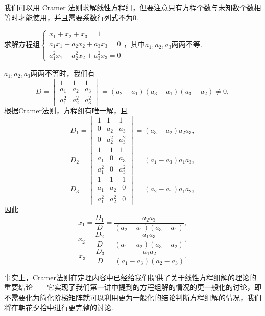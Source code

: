 我们可以用 Cramer 法则求解线性方程组，但要注意只有方程个数与未知数个数相等时才能使用，并且需要系数行列式不为0.
\begin{example}{}{}
    求解方程组$\begin{cases}
            x_1+x_2+x_3=1          \\
            a_1x_1+a_2x_2+a_3x_3=0 \\
            a_1^2x_1+a_2^2x_2+a_3^2x_3=0
        \end{cases}$，其中$a_1,a_2,a_3$两两不等.
\end{example}

\begin{solution}
    $a_1,a_2,a_3$两两不等时，我们有
    \[D=\begin{vmatrix}
            1     & 1     & 1     \\
            a_1   & a_2   & a_3   \\
            a_1^2 & a_2^2 & a_3^2
        \end{vmatrix}=(a_2-a_1)(a_3-a_1)(a_3-a_2)\neq 0,\]
    根据Cramer法则，方程组有唯一解，且
    \[D_1=\begin{vmatrix}
            1 & 1     & 1     \\
            0 & a_2   & a_3   \\
            0 & a_2^2 & a_3^2
        \end{vmatrix}=(a_3-a_2)a_2a_3,\]
    \[D_2=\begin{vmatrix}
            1     & 1 & 1     \\
            a_1   & 0 & a_3   \\
            a_1^2 & 0 & a_3^2
        \end{vmatrix}=(a_1-a_3)a_1a_3,\]
    \[D_3=\begin{vmatrix}
            1     & 1     & 1 \\
            a_1   & a_2   & 0 \\
            a_1^2 & a_2^2 & 0
        \end{vmatrix}=(a_2-a_1)a_1a_2,\]
    因此
    \[x_1=\dfrac{D_1}{D}=\dfrac{a_2a_3}{(a_2-a_1)(a_3-a_1)},\]\[x_2=\dfrac{D_2}{D}=\dfrac{a_1a_3}{(a_1-a_2)(a_3-a_2)},\]\[x_3=\dfrac{D_3}{D}=\dfrac{a_1a_2}{(a_1-a_3)(a_2-a_3)}.\]
\end{solution}

事实上，Cramer法则在定理内容中已经给我们提供了关于线性方程组解的理论的重要结论——它实现了我们第一讲中提到的方程组解的情况的更一般化的讨论，即不需要化为简化阶梯矩阵就可以利用更为一般化的结论判断方程组解的情况，我们将在朝花夕拾中进行更完整的讨论.

